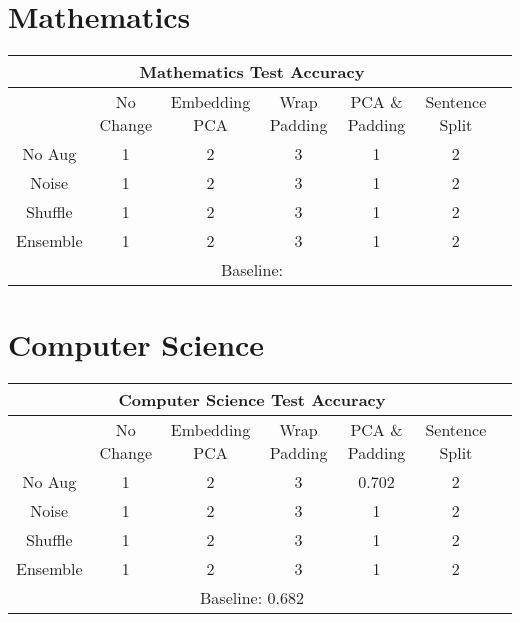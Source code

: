 \section{Mathematics}
\begin{center}
 \begin{tabular}{|c||c|c|c|c|c|c|}
  \hline
  \multicolumn{6}{|c|}{\textbf{Mathematics Test Accuracy}}\\ \hline
   & No Change & Embedding PCA & Wrap Padding & PCA \& Padding & Sentence Split\\  \hline
   No Aug & 1 & 2 & 3 & 1 & 2 \\      \hline
   Noise & 1 & 2 & 3 & 1 & 2  \\      \hline
   Shuffle & 1 & 2 & 3 & 1 & 2 \\      \hline
   Ensemble & 1 & 2 & 3 & 1 & 2 \\      \hline
   \multicolumn{6}{|c|}{Baseline: }\\ \hline
   \end{tabular}
  \end{center}

\section{Computer Science}
\begin{center}
 \begin{tabular}{|c||c|c|c|c|c|c|}
  \hline
  \multicolumn{6}{|c|}{\textbf{Computer Science Test Accuracy}}\\ \hline
   & No Change & Embedding PCA & Wrap Padding & PCA \& Padding & Sentence Split\\  \hline
   No Aug & 1 & 2 & 3 & 0.702 & 2 \\      \hline
   Noise & 1 & 2 & 3 & 1 & 2  \\      \hline
   Shuffle & 1 & 2 & 3 & 1 & 2 \\      \hline
   Ensemble & 1 & 2 & 3 & 1 & 2 \\      \hline
   \multicolumn{6}{|c|}{Baseline: 0.682}\\ \hline
 \end{tabular}
\end{center}

